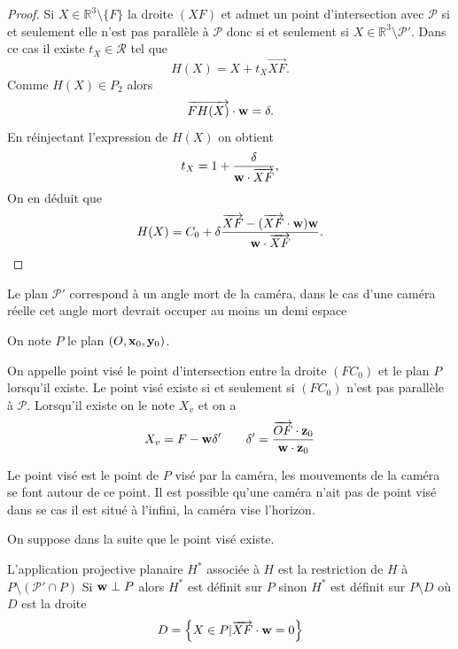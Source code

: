\begin{proof}
Si $X\in \mathbb{R}^3 \setminus \{F\}$ la droite $(XF)$ et admet un point d'intersection avec $\mathcal{P}$ si et seulement elle n'est pas parallèle à $\mathcal{P}$ donc si et seulement si $X\in \mathbb{R}^3 \setminus \mathcal{P}'$. Dans ce cas il existe $t_X\in \mathcal{R}$ tel que 
\begin{equation*}
H(X)=X+t_{X}\overrightarrow{XF}.
\end{equation*}
Comme $H(X)\in P_{2}$ alors
\begin{equation*}
\overrightarrow{FH(X)}\cdot \mathbf{w} =\delta.
\end{equation*}
En réinjectant l'expression de $H(X)$ on obtient
\begin{equation*}
t_{X}=1+\frac{\delta}{\mathbf{w} \cdot \overrightarrow{XF}},
\end{equation*}
 On en déduit que 
\begin{equation*}
H(X) = C_0 +  \delta \frac{\overrightarrow{XF}-(\overrightarrow{XF}\cdot \mathbf{w} )\mathbf{w}}{\mathbf{w} \cdot \overrightarrow{XF}}.
\end{equation*}
\end{proof}
\begin{remarque}
Le plan $\mathcal{P}'$ correspond à un angle mort de la caméra, dans le cas d'une caméra réelle cet angle mort devrait occuper au moins un demi espace 
\end{remarque}
On note $P$ le plan $(O,\mathbf{x}_0,\mathbf{y}_0)$.
\begin{Def} On appelle point visé le point d'intersection entre la droite $(FC_0)$ et le plan $P$ lorsqu'il existe. Le point visé existe si et seulement si $(FC_0)$ n'est pas parallèle à  $\mathcal{P}$. Lorsqu'il existe on le note $X_v$ et on a
\begin{equation*}
X_v=F-\mathbf{w} \delta'~~~~~~\delta'=\frac{\overrightarrow{OF}\cdot \mathbf{z}_0}{\mathbf{w} \cdot \mathbf{z}_0}
\label{formule_point_vise}
\end{equation*}
\label{point_vise}
\end{Def}
\begin{remarque}
Le point visé est le point de $P$ visé par la caméra, les mouvements de la caméra se font autour de ce point. Il est possible qu'une caméra n'ait pas de point visé dans se cas il est situé à l'infini, la caméra vise l'horizon. 
\end{remarque}
On suppose dans la suite que le point visé existe.
\begin{Def}
L'application projective planaire $H^*$ associée à $H$ est la restriction de $H$ à $P\setminus (\mathcal{P}'\cap P)$ 
Si $\mathbf{w} \perp P $ alors $H^*$ est définit sur $P$ sinon $H^*$ est définit sur $P\setminus D$ où $D$ est la droite
\begin{equation*}
D=\left\{ X\in P | \overrightarrow{XF}\cdot \mathbf{w} = 0\right\}
\end{equation*}
\end{Def}
